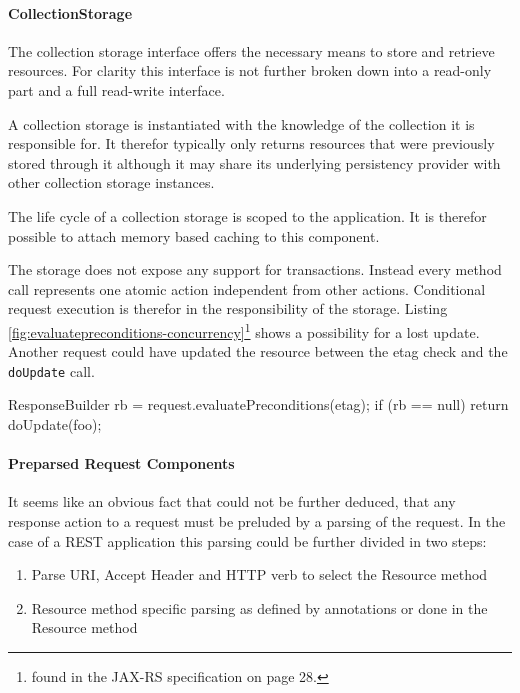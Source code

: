 \documentclass[12pt,a4paper]{scrartcl}		%
\begin{document}
\paragraph{CollectionStorage}
\label{sec:collectionstorage}

The collection storage interface offers the necessary means to store and
retrieve resources. For clarity this interface is not further broken down into a
read-only part and a full read-write interface.

A collection storage is instantiated with the knowledge of the collection it is
responsible for. It therefor typically only returns resources that were
previously stored through it although it may share its underlying persistency
provider with other collection storage instances.

The life cycle of a collection storage is scoped to the application. It is
therefor possible to attach memory based caching to this component.

The storage does not expose any support for transactions. Instead every method
call represents one atomic action independent from other actions. Conditional
request execution is therefor in the responsibility of the storage. Listing
\ref{fig:evaluatepreconditions-concurrency}\footnote{found in the JAX-RS
  specification on page 28.} shows a possibility for a lost update. Another
request could have updated the resource between the etag check and the
\lstinline:doUpdate: call.

\begin{javalisting}[label=fig:evaluatepreconditions-concurrency,
                   caption={Potential lost-update problem with JAX-RS}]
ResponseBuilder rb = request.evaluatePreconditions(etag);
if (rb == null)
  return doUpdate(foo);
\end{javalisting}



\paragraph{Preparsed Request Components}
\label{sec:prep-requ-comp}

It seems like an obvious fact that could not be further deduced, that any
response action to a request must be preluded by a parsing of the request. In
the case of a REST application this parsing could be further divided in two
steps:
\begin{enumerate}
\item Parse URI, Accept Header and HTTP verb to select the Resource method
\item Resource method specific parsing as defined by annotations or done in the
  Resource method
\end{enumerate}
\end{document}
